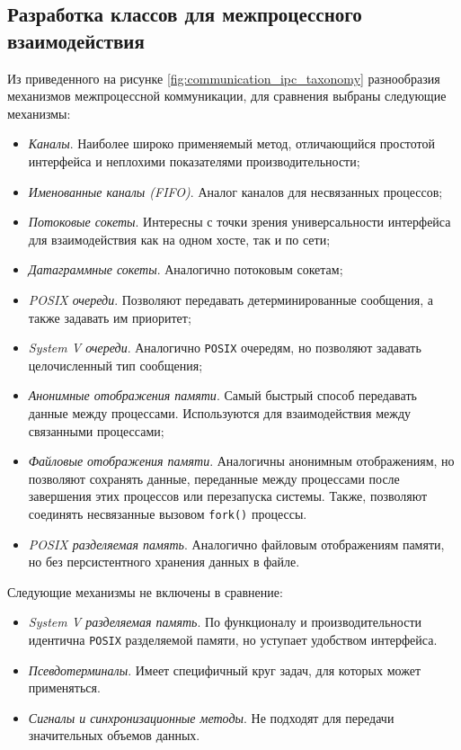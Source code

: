 \documentclass[14pt, russian]{scrartcl}
\begin{document}
\subsection{Разработка классов для межпроцессного взаимодействия}

Из приведенного на рисунке \ref{fig:communication_ipc_taxonomy} разнообразия
механизмов межпроцессной коммуникации, для сравнения выбраны следующие
механизмы:

\begin{itemize}
  \item \emph{Каналы}. Наиболее широко применяемый метод, отличающийся простотой
        интерфейса и неплохими показателями производительности;
  \item \emph{Именованные каналы (FIFO)}. Аналог каналов для несвязанных процессов;
  \item \emph{Потоковые сокеты}. Интересны с точки зрения универсальности
        интерфейса для взаимодействия как на одном хосте, так и по сети;
  \item \emph{Датаграммные сокеты}. Аналогично потоковым сокетам;
  \item \emph{POSIX очереди}. Позволяют передавать детерминированные
        сообщения, а также задавать им приоритет;
  \item \emph{System V очереди}. Аналогично \verb|POSIX| очередям, но
        позволяют задавать целочисленный тип сообщения;
  \item \emph{Анонимные отображения памяти}. Самый быстрый способ передавать
        данные между процессами. Используются для взаимодействия между
        связанными процессами;
  \item \emph{Файловые отображения памяти}. Аналогичны анонимным отображениям,
        но позволяют сохранять данные, переданные между процессами после
        завершения этих процессов или перезапуска системы. Также, позволяют
        соединять несвязанные вызовом \verb|fork()| процессы.
  \item \emph{POSIX разделяемая память}. Аналогично файловым отображениям
        памяти, но без персистентного хранения данных в файле.
\end{itemize}

Следующие механизмы не включены в сравнение:

\begin{itemize}
  \item \emph{System V разделяемая память}. По функционалу и
        производительности идентична \verb|POSIX| разделяемой памяти, но
        уступает удобством интерфейса.
  \item \emph{Псевдотерминалы}. Имеет специфичный круг задач, для которых может
        применяться.
  \item \emph{Сигналы и синхронизационные методы}. Не подходят для передачи
        значительных объемов данных.
\end{itemize}
\end{document}
